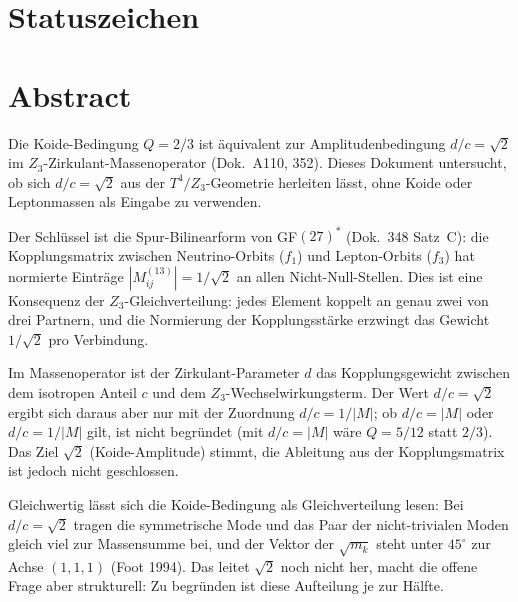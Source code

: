 \providecommand{\BM}{\textbf{[B]}}
\providecommand{\KM}{\textbf{[K]}}
\providecommand{\SM}{\textbf{[S]}}
\providecommand{\QM}{\textbf{[Q]}}

{}

\section*{Statuszeichen}


\section*{Abstract}

Die Koide-Bedingung $Q = 2/3$ ist äquivalent zur Amplitudenbedingung
$d/c = \sqrt{2}$ im $Z_3$-Zirkulant-Massenoperator (Dok.~A110, 352).
Dieses Dokument untersucht, ob sich $d/c = \sqrt{2}$ aus der $T^4/Z_3$-Geometrie
herleiten lässt, ohne Koide oder Leptonmassen als Eingabe zu verwenden.

Der Schlüssel ist die Spur-Bilinearform von GF$(27)^*$ (Dok.~348 Satz~C):
die Kopplungsmatrix zwischen Neutrino-Orbits ($f_1$) und Lepton-Orbits ($f_3$)
hat normierte Einträge $|M^{(13)}_{ij}| = 1/\sqrt{2}$ an allen Nicht-Null-Stellen.
Dies ist eine Konsequenz der $Z_3$-Gleichverteilung: jedes Element koppelt
an genau zwei von drei Partnern, und die Normierung der Kopplungsstärke
erzwingt das Gewicht $1/\sqrt{2}$ pro Verbindung.

Im Massenoperator ist der Zirkulant-Parameter $d$ das Kopplungsgewicht zwischen
dem isotropen Anteil $c$ und dem $Z_3$-Wechselwirkungsterm. Der Wert
$d/c = \sqrt{2}$ ergibt sich daraus aber nur mit der Zuordnung $d/c = 1/|M|$;
ob $d/c = |M|$ oder $d/c = 1/|M|$ gilt, ist nicht begründet (mit $d/c = |M|$
wäre $Q = 5/12$ statt $2/3$). Das Ziel $\sqrt{2}$ (Koide-Amplitude) stimmt, die
Ableitung aus der Kopplungsmatrix ist jedoch nicht geschlossen.

Gleichwertig lässt sich die Koide-Bedingung als Gleichverteilung lesen: Bei
$d/c = \sqrt{2}$ tragen die symmetrische Mode und das Paar der nicht-trivialen
Moden gleich viel zur Massensumme bei, und der Vektor der $\sqrt{m_k}$ steht
unter $45^\circ$ zur Achse $(1,1,1)$ (Foot 1994). Das leitet $\sqrt{2}$ noch
nicht her, macht die offene Frage aber strukturell: Zu begründen ist diese
Aufteilung je zur Hälfte.

